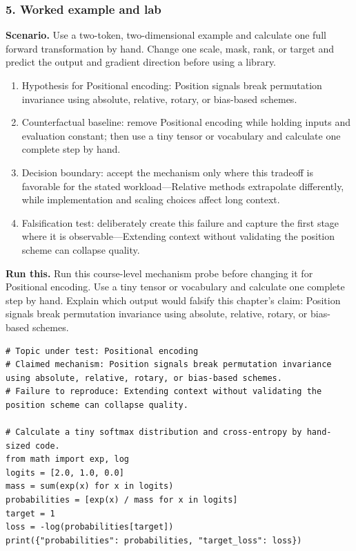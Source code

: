 \subsubsection*{5. Worked example and lab}
\textbf{Scenario.} Use a two-token, two-dimensional example and calculate one full forward transformation by hand. Change one scale, mask, rank, or target and predict the output and gradient direction before using a library.
\begin{enumerate}
\item Hypothesis for Positional encoding: Position signals break permutation invariance using absolute, relative, rotary, or bias-based schemes.
\item Counterfactual baseline: remove Positional encoding while holding inputs and evaluation constant; then use a tiny tensor or vocabulary and calculate one complete step by hand.
\item Decision boundary: accept the mechanism only where this tradeoff is favorable for the stated workload—Relative methods extrapolate differently, while implementation and scaling choices affect long context.
\item Falsification test: deliberately create this failure and capture the first stage where it is observable—Extending context without validating the position scheme can collapse quality.
\end{enumerate}
\textbf{Run this.} Run this course-level mechanism probe before changing it for Positional encoding. Use a tiny tensor or vocabulary and calculate one complete step by hand. Explain which output would falsify this chapter's claim: Position signals break permutation invariance using absolute, relative, rotary, or bias-based schemes.
\begin{Verbatim}[fontsize=\scriptsize]
# Topic under test: Positional encoding
# Claimed mechanism: Position signals break permutation invariance using absolute, relative, rotary, or bias-based schemes.
# Failure to reproduce: Extending context without validating the position scheme can collapse quality.

# Calculate a tiny softmax distribution and cross-entropy by hand-sized code.
from math import exp, log
logits = [2.0, 1.0, 0.0]
mass = sum(exp(x) for x in logits)
probabilities = [exp(x) / mass for x in logits]
target = 1
loss = -log(probabilities[target])
print({"probabilities": probabilities, "target_loss": loss})
\end{Verbatim}
